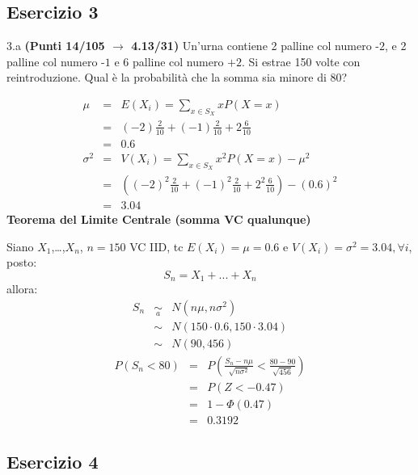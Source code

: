 \documentclass[
  11pt,
]{book}
\theoremstyle{mytheoremstyle}
\theoremstyle{mydefstyle}
\newenvironment{sol}
  {
  \begin{tcolorbox}[enhanced,breakable,arc=0.1mm,boxrule=1pt,colback=white,colframe=iblue,
  title=\bf \fontfamily{lmss}\selectfont \hspace{.5 cm} Soluzione,drop fuzzy shadow]

}{
\end{tcolorbox}
  }
\begin{document}
\subsection{Esercizio 3}\label{esercizio-3-42}

3.a \textbf{(Punti 14/105 \(\rightarrow\) 4.13/31)} Un'urna contiene 2 palline col numero \(\mbox{-2}\), e 2 palline col numero \(\mbox{-1}\) e 6 palline col numero \(\mbox{+2}\).
Si estrae 150 volte con reintroduzione.
Qual è la probabilità che la somma sia minore di 80?

\begin{sol}
\begin{eqnarray*} \mu &=& E(X_i) = \sum_{x\in S_X}x P(X=x)\\ 
 &=& ( -2 ) \frac { 2 }{ 10 }+( -1 ) \frac { 2 }{ 10 }+ 2  \frac { 6 }{ 10 } \\ 
            &=& 0.6 \\ 
 \sigma^2 &=& V(X_i) = \sum_{x\in S_X}x^2 P(X=x)-\mu^2\\ 
 &=&\left( ( -2 ) ^2\frac { 2 }{ 10 }+( -1 ) ^2\frac { 2 }{ 10 }+ 2  ^2\frac { 6 }{ 10 } \right)-( 0.6 )^2\\ 
            &=& 3.04 
\end{eqnarray*}
\textbf{Teorema del Limite Centrale (somma VC qualunque)}

Siano \(X_1\),\ldots,\(X_n\), \(n=150\) VC IID, tc \(E(X_i)=\mu=0.6\) e \(V(X_i)=\sigma^2=3.04,\forall i\), posto:
\[
      S_n = X_1 + ... + X_n
      \]
allora:\begin{eqnarray*}
  S_n & \mathop{\sim}\limits_{a}& N(n\mu,n\sigma^2) \\
     &\sim & N(150\cdot0.6,150\cdot3.04) \\
     &\sim & N(90,456) 
  \end{eqnarray*}\begin{eqnarray*}
      P( S_n   <   80 ) 
        &=& P\left(  \frac { S_n  -  n\mu }{ \sqrt{n\sigma^2} }  <  \frac { 80  -  90 }{\sqrt{ 456 }} \right)  \\
                 &=& P\left(  Z   <   -0.47 \right) \\    
                 &=&  1-\Phi( 0.47 ) \\ &=&  0.3192 
      \end{eqnarray*}

\end{sol}

\subsection{Esercizio 4}\label{esercizio-4-42}
\end{document}
